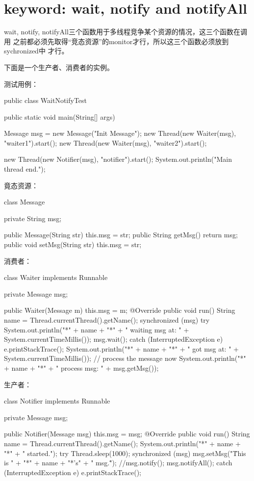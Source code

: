 \documentclass[a4paper,11pt]{article}
\begin{document}
\section[keyword: wait, notify and notifyAll]{keyword: wait, notify and notifyAll}
wait, notify, notifyAll三个函数用于多线程竞争某个资源的情况，这三个函数在调用
之前都必须先取得“竞态资源”的monitor才行，所以这三个函数必须放到sychronized中
才行。

下面是一个生产者、消费者的实例。

测试用例：

\begin{javacode}
public class WaitNotifyTest {
  public static void main(String[] args) {
    Message msg = new Message("Init Message");
    new Thread(new Waiter(msg), "waiter1").start();
    new Thread(new Waiter(msg), "waiter2").start();

    new Thread(new Notifier(msg), "notifier").start();
    System.out.println("Main thread end.");
  }
}
\end{javacode}

竟态资源：

\begin{javacode}
class Message {
  private String msg;

  public Message(String str) {
    this.msg = str;
  }
  public String getMsg() {
    return msg;
  }
  public void setMsg(String str) {
    this.msg = str;
  }
}
\end{javacode}

消费者：

\begin{javacode}
class Waiter implements Runnable {
  private Message msg;

  public Waiter(Message m) {
    this.msg = m;
  }
  @Override
  public void run() {
    String name = Thread.currentThread().getName();
    synchronized (msg) {
      try {
        System.out.println("*" + name + "*" + " waiting msg at: "
                           + System.currentTimeMillis());
        msg.wait();
      } catch (InterruptedException e) {
        e.printStackTrace();
      }
      System.out.println("*" + name + "*" + " got msg at: "
                         + System.currentTimeMillis());
      // process the message now
      System.out.println("*" + name + "*" + " process msg: " + msg.getMsg());
    }
  }
}
\end{javacode}

生产者：

\begin{javacode}
class Notifier implements Runnable {
  private Message msg;

  public Notifier(Message msg) {
    this.msg = msg;
  }
  @Override
  public void run() {
    String name = Thread.currentThread().getName();
    System.out.println("*" + name + "*" + " started.");
    try {
      Thread.sleep(1000);
      synchronized (msg) {
        msg.setMsg("\"This is " + "*" + name + "*'s" + " msg.\"");
        //msg.notify();
        msg.notifyAll();
      }
    } catch (InterruptedException e) {
      e.printStackTrace();
    }
  }
}
\end{javacode}
\end{document}
